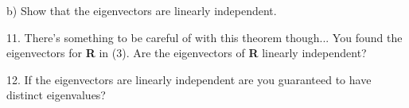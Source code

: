\documentclass{article}
\begin{document}
\begin{flushleft}
\vspace{2in}

\hspace{0.12in} b) Show that the eigenvectors are linearly independent.

\vspace{1.5in}

11. There's something to be careful of with this theorem though... You found the eigenvectors for \textbf{R} in (3). Are the eigenvectors of \textbf{R} linearly independent?

\vspace{1.5in}

12. If the eigenvectors are linearly independent are you guaranteed to have distinct eigenvalues? 


\end{flushleft}
\end{document}
